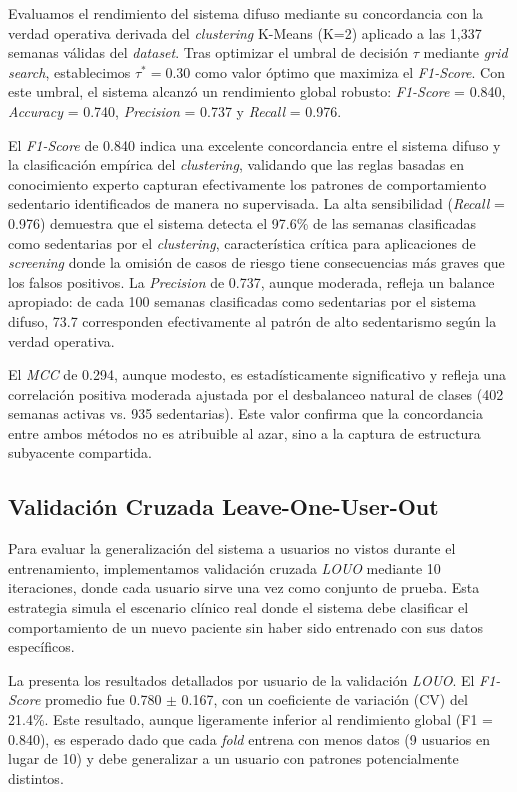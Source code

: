 Evaluamos el rendimiento del sistema difuso mediante su concordancia con la verdad operativa derivada del \textit{clustering} K-Means (K=2) aplicado a las 1,337 semanas válidas del \textit{dataset}. Tras optimizar el umbral de decisión $\tau$ mediante \textit{grid search}, establecimos $\tau^* = 0.30$ como valor óptimo que maximiza el \textit{F1-Score}. Con este umbral, el sistema alcanzó un rendimiento global robusto: \textit{F1-Score} = 0.840, \textit{Accuracy} = 0.740, \textit{Precision} = 0.737 y \textit{Recall} = 0.976.

El \textit{F1-Score} de 0.840 indica una excelente concordancia entre el sistema difuso y la clasificación empírica del \textit{clustering}, validando que las reglas basadas en conocimiento experto capturan efectivamente los patrones de comportamiento sedentario identificados de manera no supervisada. La alta sensibilidad (\textit{Recall} = 0.976) demuestra que el sistema detecta el 97.6\% de las semanas clasificadas como sedentarias por el \textit{clustering}, característica crítica para aplicaciones de \textit{screening} donde la omisión de casos de riesgo tiene consecuencias más graves que los falsos positivos. La \textit{Precision} de 0.737, aunque moderada, refleja un balance apropiado: de cada 100 semanas clasificadas como sedentarias por el sistema difuso, 73.7 corresponden efectivamente al patrón de alto sedentarismo según la verdad operativa.

El \textit{MCC} de 0.294, aunque modesto, es estadísticamente significativo y refleja una correlación positiva moderada ajustada por el desbalanceo natural de clases (402 semanas activas vs. 935 sedentarias). Este valor confirma que la concordancia entre ambos métodos no es atribuible al azar, sino a la captura de estructura subyacente compartida.

\subsection{Validación Cruzada Leave-One-User-Out}

Para evaluar la generalización del sistema a usuarios no vistos durante el entrenamiento, implementamos validación cruzada \textit{LOUO} mediante 10 iteraciones, donde cada usuario sirve una vez como conjunto de prueba. Esta estrategia simula el escenario clínico real donde el sistema debe clasificar el comportamiento de un nuevo paciente sin haber sido entrenado con sus datos específicos.

La  presenta los resultados detallados por usuario de la validación \textit{LOUO}. El \textit{F1-Score} promedio fue 0.780 $\pm$ 0.167, con un coeficiente de variación (CV) del 21.4\%. Este resultado, aunque ligeramente inferior al rendimiento global (F1 = 0.840), es esperado dado que cada \textit{fold} entrena con menos datos (9 usuarios en lugar de 10) y debe generalizar a un usuario con patrones potencialmente distintos.

